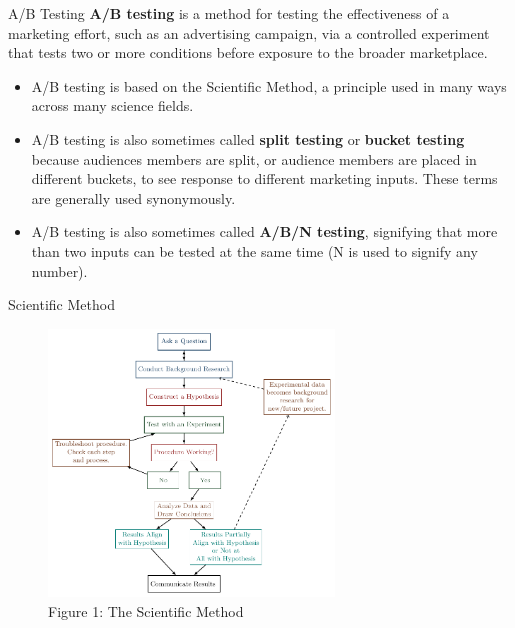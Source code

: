 \documentclass[pdf]{beamer}
\newcommand{\empr}[1]{{\color{franklinblue}\textbf{#1}}}
\theoremstyle{remark}
\theoremstyle{definition}
\begin{document}
\begin{frame}[t]{A/B Testing}
\empr{A/B testing} is a method for testing the effectiveness of a marketing effort, such as an advertising campaign, via a controlled experiment that tests two or more conditions before exposure to the broader marketplace. \\
\vspace{0.5ex}
\small
\begin{itemize}
\item A/B testing is based on the Scientific Method, a principle used in many ways across many science fields.
\item A/B testing is also sometimes called \empr{split testing} or \empr{bucket testing} because audiences members are split, or audience members are placed in different buckets, to see response to different marketing inputs. These terms are generally used synonymously.
\item A/B testing is also sometimes called \empr{A/B/N testing}, signifying that more than two inputs can be tested at the same time (N is used to signify any number). 
\end{itemize}
\end{frame}

\begin{frame}[t]{Scientific Method}
\begin{figure}[htbp]
  \captionsetup{justification=centering}
  \includegraphics[height=7.1cm, trim=1.0cm 0.3cm 1.0cm 0.6cm width=7.1cm]{Scientific_Method.pdf}
  \caption{Figure {\color{franklinblue} 1}: The Scientific Method}
\end{figure}
\end{frame}
\end{document}
